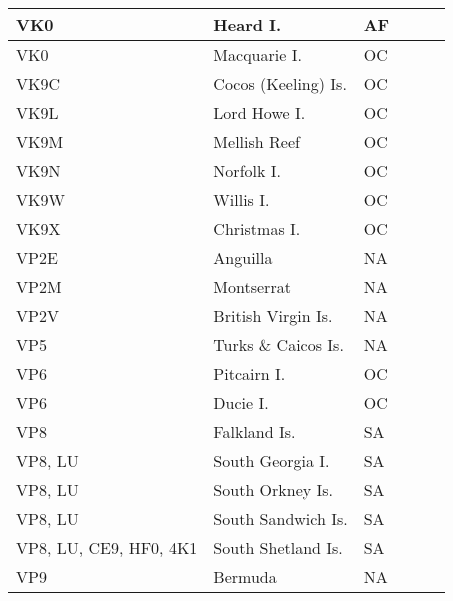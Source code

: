 \documentclass[a4paper]{article}
\begin{document}
\begin{longtable}{|p{1.5cm}|p{4cm}|l|p{2cm}|p{2cm}|p{2cm}|}
\hline
VK0                    & Heard I.                                   & AF    & & & \\
\hline
VK0                    & Macquarie I.                               & OC    & & & \\
\hline
VK9C                   & Cocos (Keeling) Is.                        & OC    & & & \\
\hline
VK9L                   & Lord Howe I.                               & OC    & & & \\
\hline
VK9M                   & Mellish Reef                               & OC    & & & \\
\hline
VK9N                   & Norfolk I.                                 & OC    & & & \\
\hline
VK9W                   & Willis I.                                  & OC    & & & \\
\hline
VK9X                   & Christmas I.                               & OC    & & & \\
\hline
VP2E                   & Anguilla                                   & NA    & & & \\
\hline
VP2M                   & Montserrat                                 & NA    & & & \\
\hline
VP2V                   & British Virgin Is.                         & NA    & & & \\
\hline
VP5                    & Turks \& Caicos Is.                        & NA    & & & \\
\hline
VP6                    & Pitcairn I.                                & OC    & & & \\
\hline
VP6                    & Ducie I.                                   & OC    & & & \\
\hline
VP8                    & Falkland Is.                               & SA    & & & \\
\hline
VP8, LU                & South Georgia I.                           & SA    & & & \\
\hline
VP8, LU                & South Orkney Is.                           & SA    & & & \\
\hline
VP8, LU                & South Sandwich Is.                         & SA    & & & \\
\hline
VP8, LU, CE9, HF0, 4K1 & South Shetland Is.                         & SA    & & & \\
\hline
VP9                    & Bermuda                                    & NA    & & & \\

\end{longtable}
\end{document}
